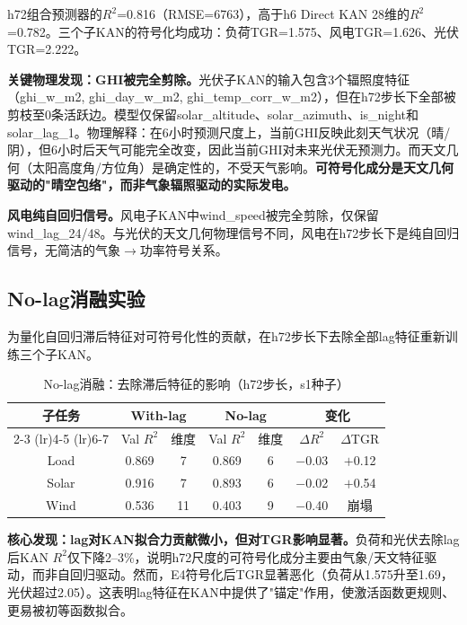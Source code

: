 \documentclass[12pt,a4paper,oneside]{ctexbook}
\begin{document}
h72组合预测器的$R^2$=0.816（RMSE=6763），高于h6 Direct KAN 28维的$R^2$=0.782。三个子KAN的符号化均成功：负荷TGR=1.575、风电TGR=1.626、光伏TGR=2.222。

\textbf{关键物理发现：GHI被完全剪除。}光伏子KAN的输入包含3个辐照度特征（ghi\_w\_m2, ghi\_day\_w\_m2, ghi\_temp\_corr\_w\_m2），但在h72步长下全部被剪枝至0条活跃边。模型仅保留solar\_altitude、solar\_azimuth、is\_night和solar\_lag\_1。物理解释：在6小时预测尺度上，当前GHI反映此刻天气状况（晴/阴），但6小时后天气可能完全改变，因此当前GHI对未来光伏无预测力。而天文几何（太阳高度角/方位角）是确定性的，不受天气影响。\textbf{可符号化成分是天文几何驱动的"晴空包络"，而非气象辐照驱动的实际发电。}

\textbf{风电纯自回归信号。}风电子KAN中wind\_speed被完全剪除，仅保留wind\_lag\_24/48。与光伏的天文几何物理信号不同，风电在h72步长下是纯自回归信号，无简洁的气象$\to$功率符号关系。

\subsection{No-lag消融实验}
\label{sec:nolag-ablation}

为量化自回归滞后特征对可符号化性的贡献，在h72步长下去除全部lag特征重新训练三个子KAN。

\begin{table}[htbp]
\centering
\caption{No-lag消融：去除滞后特征的影响（h72步长，s1种子）}
\label{tab:nolag-ablation}
\begin{tabular}{ccccccc}
\toprule
子任务 & \multicolumn{2}{c}{With-lag} & \multicolumn{2}{c}{No-lag} & \multicolumn{2}{c}{变化} \\
\cmidrule(lr){2-3} \cmidrule(lr){4-5} \cmidrule(lr){6-7}
 & Val $R^2$ & 维度 & Val $R^2$ & 维度 & $\Delta R^2$ & $\Delta$TGR \\
\midrule
Load & 0.869 & 7 & 0.869 & 6 & $-$0.03 & $+$0.12 \\
Solar & 0.916 & 7 & 0.893 & 6 & $-$0.02 & $+$0.54 \\
Wind & 0.536 & 11 & 0.403 & 9 & $-$0.40 & 崩塌 \\
\bottomrule
\end{tabular}
\end{table}

\textbf{核心发现：lag对KAN拟合力贡献微小，但对TGR影响显著。}负荷和光伏去除lag后KAN $R^2$仅下降2--3\%，说明h72尺度的可符号化成分主要由气象/天文特征驱动，而非自回归驱动。然而，E4符号化后TGR显著恶化（负荷从1.575升至1.69，光伏超过2.05）。这表明lag特征在KAN中提供了"锚定"作用，使激活函数更规则、更易被初等函数拟合。
\end{document}
